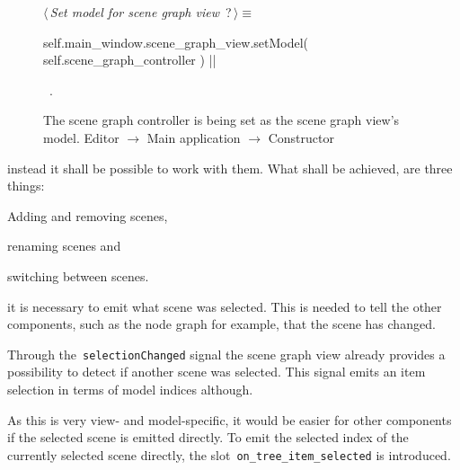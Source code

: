 \documentclass[%
    a4paper,    %
    justified,  %
    nobib,      %
    openany     %
]{tufte-book}
\begin{document}
\begin{figure}
\begin{flushleft} \small
\begin{minipage}{\linewidth}\label{scrap42}\raggedright\small
{} $\langle\,${\itshape Set model for scene graph view}\nobreak\ {\footnotesize {?}}$\,\rangle\equiv$
\vspace{-1ex}
\begin{pythoncode}
self.main_window.scene_graph_view.setModel(
    self.scene_graph_controller
)
|\NWsep|
\end{pythoncode}
\vspace{1.5ex}
\footnotesize
\begin{list}{}{\setlength{\itemsep}{-\parsep}\setlength{\itemindent}{-\leftmargin}}
\item \NWtxtMacroRefIn\ .

\item{}
\end{list}
\end{minipage}\vspace{4ex}
\end{flushleft}
\caption{The scene graph controller is being set as the scene graph view's
  model.
  \newline{}\newline{}Editor $\rightarrow$ Main application
  $\rightarrow$ Constructor}
\label{editor:lst:main-application:constructor:set-model}
\end{figure}

 instead it shall be
possible to work with them. What shall be achieved, are three things:
\begin{enumerate*}
  \item Adding and removing scenes,
  \item renaming scenes and
  \item switching between scenes.
\end{enumerate*}

 it is necessary to emit what scene was
selected. This is needed to tell the other components, such as the node graph
for example, that the scene has changed.

Through the~\verb=selectionChanged= signal the scene graph view already provides
a possibility to detect if another scene was selected. This signal emits an item
selection in terms of model indices although.

As this is very view- and model-specific, it would be easier for other
components if the selected scene is emitted directly. To emit the selected index
of the currently selected scene directly, the slot~\verb=on_tree_item_selected=
is introduced.
\end{document}
